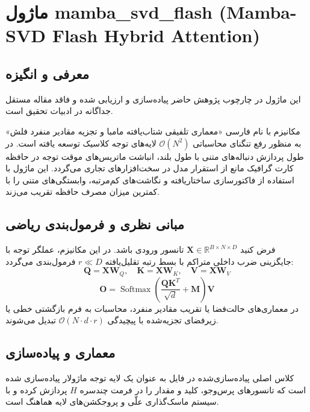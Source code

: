 \section{ماژول mamba\_svd\_flash (Mamba-SVD Flash Hybrid Attention)}
\label{sec:module_mamba_svd_flash}

\subsection{معرفی و انگیزه}
این ماژول در چارچوب پژوهش حاضر پیاده‌سازی و ارزیابی شده و فاقد مقاله مستقل جداگانه در ادبیات تحقیق است.

مکانیزم  با نام فارسی «معماری تلفیقی شتاب‌یافته مامبا و تجزیه مقادیر منفرد فلش» به منظور رفع تنگنای محاسباتی $\mathcal{O}(N^2)$ لایه‌های توجه کلاسیک توسعه یافته است. در طول پردازش دنباله‌های متنی با طول بلند، انباشت ماتریس‌های موقت توجه در حافظه کارت گرافیک مانع از استقرار مدل در سخت‌افزارهای تجاری می‌گردد. این ماژول با استفاده از فاکتورسازی ساختاریافته و نگاشت‌های کم‌مرتبه، وابستگی‌های متنی را با کمترین میزان مصرف حافظه تقریب می‌زند.

\subsection{مبانی نظری و فرمول‌بندی ریاضی}
فرض کنید $\mathbf{X} \in \mathbb{R}^{B \times N \times D}$ تانسور ورودی باشد. در این مکانیزم، عملگر توجه با جایگزینی ضرب داخلی متراکم با بسط رتبه تقلیل‌یافته $r \ll D$ فرمول‌بندی می‌گردد:
 \begin{equation}
\mathbf{Q} = \mathbf{X} \mathbf{W}_Q, \quad \mathbf{K} = \mathbf{X} \mathbf{W}_K, \quad \mathbf{V} = \mathbf{X} \mathbf{W}_V
\end{equation}
 \begin{equation}
\mathbf{O} = \operatorname{Softmax}\left(\frac{\mathbf{Q} \mathbf{K}^T}{\sqrt{d}} + \mathbf{M}
\right) \mathbf{V}
\end{equation}
در معماری‌های حالت‌فضا یا تقریب مقادیر منفرد، محاسبات به فرم بازگشتی خطی یا زیرفضای تجزیه‌شده با پیچیدگی $\mathcal{O}(N \cdot d \cdot r)$ تبدیل می‌شوند.

\subsection{معماری و پیاده‌سازی}
کلاس اصلی پیاده‌سازی‌شده در فایل  به عنوان یک لایه توجه ماژولار پیاده‌سازی شده است که تانسورهای پرس‌وجو، کلید و مقدار را در فرمت چندسره $H$ پردازش کرده و با سیستم ماسک‌گذاری علّی و پروجکشن‌های لایه هماهنگ است.

